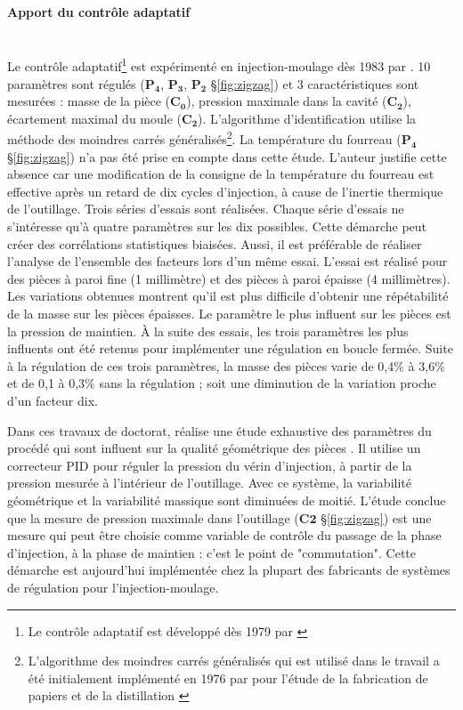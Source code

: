 \paragraph{Apport du contrôle adaptatif}\mbox{} \\
Le contrôle adaptatif\footnote{Le contrôle adaptatif est développé dès 1979 par \citeauthor{landau_adaptive_1979, egardt_stability_1979} \cite{landau_adaptive_1979, egardt_stability_1979}} est expérimenté en injection-moulage dès 1983 par \citeauthor{sanschagrin_process_1983} \cite{sanschagrin_process_1983}.
10 paramètres sont régulés ($\boldsymbol{P_4}$, $\boldsymbol{P_3}$, $\boldsymbol{P_2}$ §\ref{fig:zigzag}) et 3 caractéristiques sont mesurées : masse de la pièce ($\boldsymbol{C_0}$), pression maximale dans la cavité ($\boldsymbol{C_2}$), écartement maximal du moule ($\boldsymbol{C_2}$).
L'algorithme d'identification utilise la méthode des moindres carrés généralisés\footnote{L'algorithme des moindres carrés généralisés qui est utilisé dans le travail \citeauthor{sanschagrin_process_1983} a été initialement implémenté en 1976 par \citeauthor{bethoux_approche_1976} pour l'étude de la fabrication de papiers et de la distillation \cite{bethoux_approche_1976}}.
La température du fourreau ($\boldsymbol{P_4}$ §\ref{fig:zigzag}) n'a pas été prise en compte dans cette étude.
L'auteur justifie cette absence car une modification de la consigne de la température du fourreau est effective après un retard de dix cycles d’injection, à cause de l'inertie thermique de l'outillage.
Trois séries d'essais sont réalisées.
Chaque série d’essais ne s’intéresse qu’à quatre paramètres sur les dix possibles.
Cette démarche peut créer des corrélations statistiques biaisées.
Aussi, il est préférable de réaliser l'analyse de l'ensemble des facteurs lors d'un même essai.
L'essai est réalisé pour des pièces à paroi fine (1 millimètre) et des pièces à paroi épaisse (4 millimètres).
Les variations obtenues montrent qu'il est plus difficile d'obtenir une répétabilité de la masse sur les pièces épaisses.
Le paramètre le plus influent sur les pièces est la pression de maintien.
À la suite des essais, les trois paramètres les plus influents ont été retenus pour implémenter une régulation en boucle fermée.
Suite à la régulation de ces trois paramètres, la masse des pièces varie de 0,4\% à 3,6\% et de 0,1 à 0,3\% sans la régulation ; soit une diminution de la variation proche d’un facteur dix.

Dans ces travaux de doctorat, \citeauthor{devos_contribution_1990} réalise une étude exhaustive des paramètres du procédé qui sont influent sur la qualité géométrique des pièces \cite{devos_contribution_1990}.
Il utilise un correcteur PID pour réguler la pression du vérin d’injection, à partir de la pression mesurée à l'intérieur de l'outillage.
Avec ce système, la variabilité géométrique et la variabilité massique sont diminuées de moitié.
L'étude conclue que la mesure de pression maximale dans l'outillage  ($\boldsymbol{C2}$ §\ref{fig:zigzag}) est une mesure qui peut être choisie comme variable de contrôle du passage de la phase d’injection, à la phase de maintien : c'est le point de "commutation".
Cette démarche est aujourd'hui implémentée chez la plupart des fabricants de systèmes de régulation pour l'injection-moulage.

